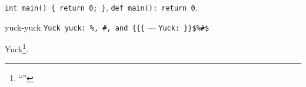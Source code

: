 \documentclass{article}
\def\c{\verb}
\def\python{\verb}
\begin{document}
\c|int main() { return 0; }|, \python`def main(): return 0`.

\begin{ESHSavedVerb}{yuck-yuck}
  \c|Yuck yuck: %
\end{ESHSavedVerb}

Yuck\footnote{``''}.
\end{document}

